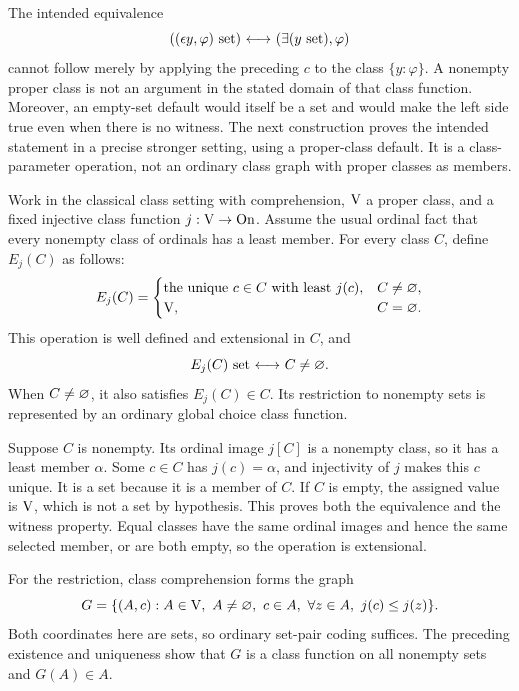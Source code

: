 \begin{remark}
The intended equivalence
\[
((\epsilon y,\varphi)\mathrm{\ set})
{\ \longleftrightarrow\ } (\exists(y\mathrm{\ set}),\varphi)
\]
cannot follow merely by applying the preceding $c$ to the class
$\{y:\varphi\}$. A nonempty proper class is not an argument in the
stated domain of that class function. Moreover, an empty-set default
would itself be a set and would make the left side true even when
there is no witness. The next construction proves the intended
statement in a precise stronger setting, using a proper-class default.
It is a class-parameter operation, not an ordinary class graph with
proper classes as members.
\end{remark}

\begin{theorem}
Work in the classical class setting with comprehension, $\mathrm{V}$ a proper
class, and a fixed injective class function $j:\mathrm{V}\to\mathrm{On}$. Assume the
usual ordinal fact that every nonempty class of ordinals has a least
member. For every class $C$, define $E_j(C)$ as follows:
\[
E_j(C)=
\begin{cases}
\text{the unique }c\in C\text{ with least }j(c),&C\ne\varnothing,\\
\mathrm{V},&C=\varnothing.
\end{cases}
\]
This operation is well defined and extensional in $C$, and
\[
E_j(C)\mathrm{\ set}{\ \longleftrightarrow\ } C\ne\varnothing.
\]
When $C\ne\varnothing$, it also satisfies $E_j(C)\in C$.
Its restriction to nonempty sets is represented by an ordinary global
choice class function.
\end{theorem}
\Proof
Suppose $C$ is nonempty. Its ordinal image $j[C]$ is a nonempty
class, so it has a least member $\alpha$. Some $c\in C$ has
$j(c)=\alpha$, and injectivity of $j$ makes this $c$ unique. It is
a set because it is a member of $C$. If $C$ is empty, the assigned
value is $\mathrm{V}$, which is not a set by hypothesis. This proves both
the equivalence and the witness property. Equal classes have the
same ordinal images and hence the same selected member, or are both
empty, so the operation is extensional.

For the restriction, class comprehension forms the graph
\[
G=\{(A,c):A\in\mathrm{V},\ A\ne\varnothing,\ c\in A,
              \ \forall z\in A,\ j(c)\leq j(z)\}.
\]
Both coordinates here are sets, so ordinary set-pair coding suffices.
The preceding existence and uniqueness show that $G$ is a class
function on all nonempty sets and $G(A)\in A$.
\Done

